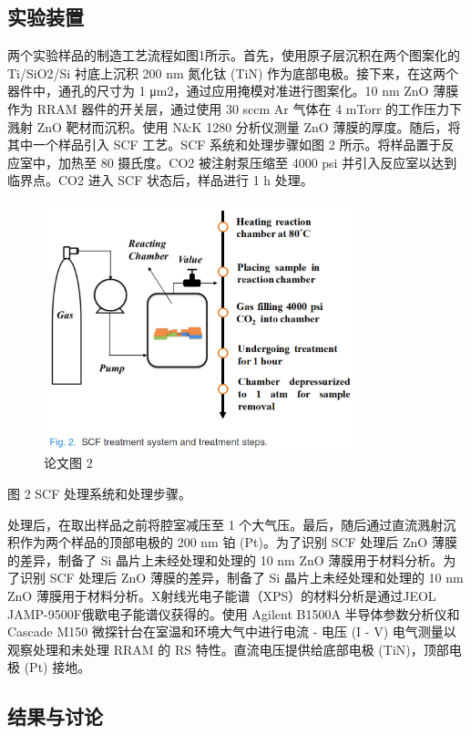 \subsection{实验装置}

两个实验样品的制造工艺流程如图1所示。首先，使用原子层沉积在两个图案化的 Ti/SiO2/Si 衬底上沉积 200 nm 氮化钛 (TiN) 作为底部电极。接下来，在这两个器件中，通孔的尺寸为 1 μm2，通过应用掩模对准进行图案化。10 nm ZnO 薄膜作为 RRAM 器件的开关层，通过使用 30 sccm Ar 气体在 4 mTorr 的工作压力下溅射 ZnO 靶材而沉积。使用 N\&K 1280 分析仪测量 ZnO 薄膜的厚度。随后，将其中一个样品引入 SCF 工艺。SCF 系统和处理步骤如图 2 所示。将样品置于反应室中，加热至 80 摄氏度。CO2 被注射泵压缩至 4000 psi 并引入反应室以达到临界点。CO2 进入 SCF 状态后，样品进行 1 h 处理。

\begin{figure}[htb]
\centering 
\includegraphics[width=0.80\textwidth]{img/c1m2.png} 
\caption{论文图 2}
\label{Test}
\end{figure}

图 2 SCF 处理系统和处理步骤。

处理后，在取出样品之前将腔室减压至 1 个大气压。最后，随后通过直流溅射沉积作为两个样品的顶部电极的 200 nm 铂 (Pt)。为了识别 SCF 处理后 ZnO 薄膜的差异，制备了 Si 晶片上未经处理和处理的 10 nm ZnO 薄膜用于材料分析。为了识别 SCF 处理后 ZnO 薄膜的差异，制备了 Si 晶片上未经处理和处理的 10 nm ZnO 薄膜用于材料分析。X射线光电子能谱（XPS）的材料分析是通过JEOL JAMP-9500F俄歇电子能谱仪获得的。使用 Agilent B1500A 半导体参数分析仪和 Cascade M150 微探针台在室温和环境大气中进行电流 - 电压 (I - V) 电气测量以观察处理和未处理 RRAM 的 RS 特性。直流电压提供给底部电极 (TiN)，顶部电极 (Pt) 接地。

\subsection{结果与讨论}

